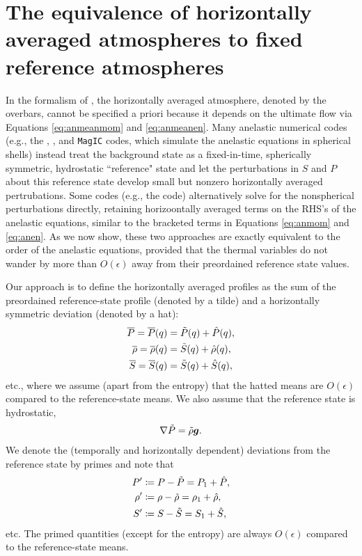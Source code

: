 \documentclass[12pt]{article}
\begin{document}
\section{The equivalence of horizontally averaged atmospheres to fixed reference atmospheres}
In the formalism of \citet{Gough1969}, the horizontally averaged atmosphere, denoted by the overbars, cannot be specified a priori because it depends on the ultimate flow via Equations \eqref{eq:anmeanmom} and \eqref{eq:anmeanen}. Many anelastic numerical codes (e.g., the {\rayleigh}, {\eulag}, and \texttt{MagIC} codes, which simulate the anelastic equations in spherical shells) instead treat the background state as a fixed-in-time, spherically symmetric, hydrostatic ``reference" state and let the perturbations in $S$ and $P$ about this reference state develop small but nonzero horizontally averaged pertrubations. Some codes (e.g., the {\ash} code) alternatively solve for the nonspherical perturbations directly, retaining horizoontally averaged terms on the RHS's of the anelastic equations, similar to the bracketed terms in Equations \eqref{eq:anmom} and \eqref{eq:anen}. As we now show, these two approaches are exactly equivalent to the order of the anelastic equations, provided that the thermal variables do not wander by more than $O(\epsilon)$ away from their preordained reference state values. 

Our approach is to define the horizontally averaged profiles as the sum of the preordained reference-state profile (denoted by a tilde) and a horizontally symmetric deviation (denoted by a hat):
\begin{align}
\overline{P}=	\overline{P}(q) &= \tilde{P}(q) + \hat{P}(q) ,\\
\overline{\rho}=	\overline{\rho}(q)  &= \tilde{S}(q)  + \hat{\rho}(q) ,\\
	\overline{S} = \overline{S} (q) &=  \tilde{S}(q)  + \hat{S}(q) ,
\end{align}
etc., where we assume (apart from the entropy) that the hatted means are $O(\epsilon)$ compared to the reference-state means. We also assume that the reference state is hydrostatic,
\begin{align}\label{eq:refhydro}
	\nabla \tilde{P} = \tilde{\rho}\bm{g}.
\end{align}
We denote the (temporally and horizontally dependent) deviations from the reference state by primes and note that 
\begin{align}
	P^\prime & \coloneqq P - \tilde{P} = P_1 + \hat{P},\\
	\rho^\prime & \coloneqq \rho - \tilde{\rho} = \rho_1 + \hat{\rho},\\
	 S^\prime & \coloneqq S -  \tilde{S} =  S_1 + \hat{S},
\end{align}
etc. The primed quantities (except for the entropy) are always $O(\epsilon)$ compared to the reference-state means. 
\end{document}
